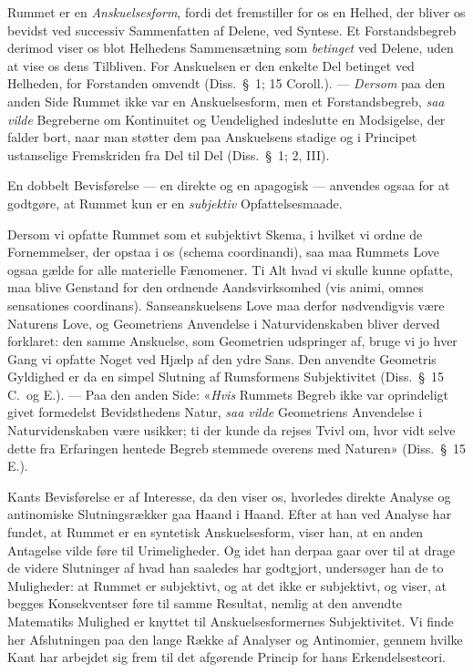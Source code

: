 \documentclass[12pt,a4paper]{article}
\newcommand{\apage}[1]{\marginnote{\footnotesize\textit{[#1]}}}
\begin{document}
Rummet er en \emph{Anskuelsesform}, fordi det fremstiller for os en Helhed, der
bliver \apage{49}  os bevidst ved successiv Sammenfatten af Delene, ved Syntese. Et
Forstandsbegreb derimod viser os blot Helhedens Sammensætning som \emph{betinget}
ved Delene, uden at vise os dens Tilbliven. For Anskuelsen er den enkelte
Del betinget ved Helheden, for Forstanden omvendt (Diss.\ §\ 1; 15
Coroll.). --- \emph{Dersom} paa den anden Side Rummet ikke var en
Anskuelsesform, men et Forstandsbegreb, \emph{saa vilde} Begreberne om
Kontinuitet og Uendelighed indeslutte en Modsigelse, der falder bort,
naar man støtter dem paa Anskuelsens stadige og i Principet ustanselige
Fremskriden fra Del til Del (Diss.\ §\ 1; 2, III).

En dobbelt Bevisførelse --- en direkte og en apagogisk --- anvendes ogsaa
for at godtgøre, at Rummet kun er en \emph{subjektiv} Opfattelsesmaade.

Dersom vi opfatte Rummet som et subjektivt Skema, i hvilket vi ordne de
Fornemmelser, der opstaa i os (schema coordinandi), saa maa
Rummets Love ogsaa gælde for alle materielle Fænomener. Ti Alt hvad vi
skulle kunne opfatte, maa blive Genstand for den ordnende Aandsvirksomhed
(vis animi, omnes sensationes coordinans). Sanseanskuelsens Love
maa derfor nødvendigvis være Naturens Love, og Geometriens Anvendelse i
Naturvidenskaben bliver derved forklaret: den samme Anskuelse, som
Geometrien udspringer af, bruge vi jo hver Gang vi opfatte Noget ved
Hjælp af den ydre Sans. Den anvendte Geometris Gyldighed er da en simpel
Slutning af Rumsformens Subjektivitet (Diss.\ §\ 15 C.\ og E.). --- Paa
den anden Side: «\emph{Hvis} Rummets Begreb ikke var oprindeligt givet
formedelst Bevidsthedens Natur, \emph{saa vilde} Geometriens Anvendelse i
Naturvidenskaben være usikker; ti der kunde da rejses Tvivl om, hvor vidt
selve dette fra Erfaringen hentede Begreb stemmede overens med Naturen»
(Diss.\ §\ 15 E.).

Kants Bevisførelse er af Interesse, da den viser os, hvorledes direkte
Analyse og antinomiske Slutningsrækker gaa Haand i Haand. Efter at han
ved Analyse har fundet, at Rummet er en syntetisk Anskuelsesform, viser
han, at en anden Antagelse vilde føre til Urimeligheder. Og idet han
derpaa gaar over til at drage de videre Slutninger af hvad han saaledes
har godtgjort, undersøger han de to Muligheder: at Rummet er subjektivt,
og at det ikke er subjektivt, og viser, at begges Konsekventser føre til
samme Resultat, nemlig at den anvendte Matematiks Mulighed er knyttet til
Anskuelsesformernes Subjektivitet. Vi finde her Afslutningen paa den
lange Række af Analyser og Antinomier, gennem hvilke Kant har arbejdet
sig frem til det afgørende Princip for hans Erkendelsesteori.
\end{document}
